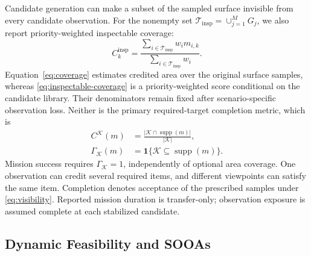 \documentclass{IEEEtaes}
\theoremstyle{remark}
\theoremstyle{plain}
\begin{document}
Candidate generation can make a subset of the sampled surface invisible from every candidate observation. For the nonempty set $\mathcal T_{\mathrm{insp}}=\cup_{j=1}^{M}G_j$, we also report priority-weighted inspectable coverage:
\begin{equation}
  C_k^{\mathrm{insp}}=
  \frac{\sum_{i\in\mathcal T_{\mathrm{insp}}}w_i m_{i,k}}
  {\sum_{i\in\mathcal T_{\mathrm{insp}}}w_i}.
  \label{eq:inspectable-coverage}
\end{equation}
Equation~\eqref{eq:coverage} estimates credited area over the original surface samples, whereas \eqref{eq:inspectable-coverage} is a priority-weighted score conditional on the candidate library. Their denominators remain fixed after scenario-specific observation loss. Neither is the primary required-target completion metric, which is
\begin{equation}
  \begin{aligned}
  C^{\mathcal K}(m)&=\frac{|\mathcal K\cap\operatorname{supp}(m)|}{|\mathcal K|},\\
  \Gamma_{\mathcal K}(m)&=\mathbf1\{\mathcal K\subseteq\operatorname{supp}(m)\}.
  \end{aligned}
  \label{eq:required-goal}
\end{equation}
Mission success requires $\Gamma_{\mathcal K}=1$, independently of optional area coverage. One observation can credit several required items, and different viewpoints can satisfy the same item. Completion denotes acceptance of the prescribed samples under \eqref{eq:visibility}. Reported mission duration is transfer-only; observation exposure is assumed complete at each stabilized candidate.

\subsection{Dynamic Feasibility and SOOAs}
\end{document}
